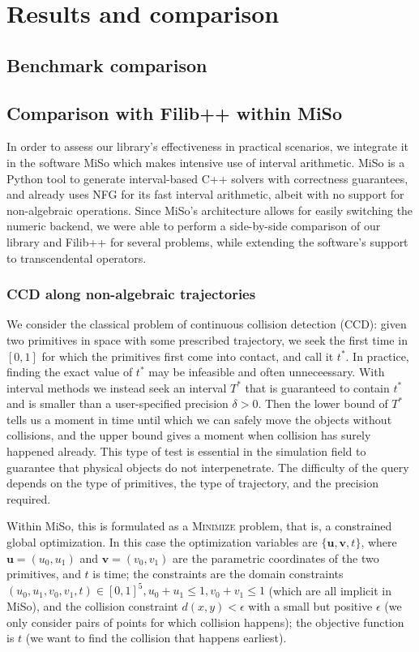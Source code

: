 \section{Results and comparison}

\subsection{Benchmark comparison}

\subsection{Comparison with Filib++ within MiSo}
In order to assess our library's effectiveness in practical scenarios, we integrate it in the software MiSo \cite{miso} which makes intensive use of interval arithmetic.
MiSo is a Python tool to generate interval-based C++ solvers with correctness guarantees, and already uses NFG for its fast interval arithmetic, albeit with no support for non-algebraic operations.
Since MiSo's architecture allows for easily switching the numeric backend, we were able to perform a side-by-side comparison of our library and Filib++ for several problems, while extending the software's support to transcendental operators.

\subsubsection{CCD along non-algebraic trajectories}
We consider the classical problem of continuous collision detection (CCD): given two primitives in space with some prescribed trajectory, we seek the first time in $[0,1]$ for which the primitives first come into contact, and call it $t^*$.
In practice, finding the exact value of $t^*$ may be infeasible and often unneceessary. With interval methods we instead seek an interval $T^*$ that is guaranteed to contain $t^*$ and is smaller than a user-specified precision $\delta>0$.
Then the lower bound of $T^*$ tells us a moment in time until which we can safely move the objects without collisions, and the upper bound gives a moment when collision has surely happened already.
This type of test is essential in the simulation field to guarantee that physical objects do not interpenetrate.
The difficulty of the query depends on the type of primitives, the type of trajectory, and the precision required.

Within MiSo, this is formulated as a \textsc{Minimize} problem, that is, a constrained global optimization.
In this case the optimization variables are $\{\mathbf{u}, \mathbf{v}, t\}$, where $\mathbf{u}=(u_0, u_1)$ and $\mathbf{v}=(v_0, v_1)$ are the parametric coordinates of the two primitives, and $t$ is time;
the constraints are the domain constraints $(u_0,u_1,v_0,v_1,t)\in[0,1]^5, u_0+u_1\leq1, v_0+v_1\leq1$ (which are all implicit in MiSo), and the collision constraint $d(x,y)<\epsilon$ with a small but positive $\epsilon$ (we only consider pairs of points for which collision happens);
the objective function is $t$ (we want to find the collision that happens earliest).

